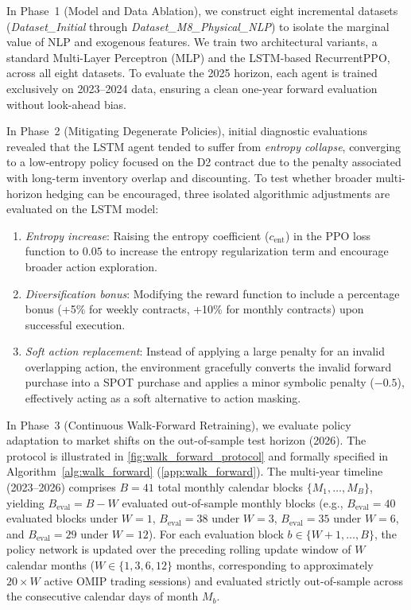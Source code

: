 In Phase~1 (Model and Data Ablation), we construct eight incremental datasets (\textit{Dataset\_Initial} through \textit{Dataset\_M8\_\allowbreak Physical\_NLP}) to isolate the marginal value of NLP and exogenous features. We train two architectural variants, a standard Multi-Layer Perceptron (MLP) and the LSTM-based RecurrentPPO, across all eight datasets. To evaluate the 2025 horizon, each agent is trained exclusively on 2023--2024 data, ensuring a clean one-year forward evaluation without look-ahead bias.

In Phase~2 (Mitigating Degenerate Policies), initial diagnostic evaluations revealed that the LSTM agent tended to suffer from \textit{entropy collapse}, converging to a low-entropy policy focused on the D2 contract due to the penalty associated with long-term inventory overlap and discounting. To test whether broader multi-horizon hedging can be encouraged, three isolated algorithmic adjustments are evaluated on the LSTM model:
\begin{enumerate}
    \item \textit{Entropy increase}: Raising the entropy coefficient ($c_{\text{ent}}$) in the PPO loss function to $0.05$ to increase the entropy regularization term and encourage broader action exploration.
    \item \textit{Diversification bonus}: Modifying the reward function to include a percentage bonus (+5\% for weekly contracts, +10\% for monthly contracts) upon successful execution.
    \item \textit{Soft action replacement}: Instead of applying a large penalty for an invalid overlapping action, the environment gracefully converts the invalid forward purchase into a SPOT purchase and applies a minor symbolic penalty ($-0.5$\texteuro), effectively acting as a soft alternative to action masking.
\end{enumerate}

In Phase~3 (Continuous Walk-Forward Retraining), we evaluate policy adaptation to market shifts on the out-of-sample test horizon (2026). The protocol is illustrated in \cref{fig:walk_forward_protocol} and formally specified in Algorithm~\ref{alg:walk_forward} (\ref{app:walk_forward}). The multi-year timeline (2023--2026) comprises $B = 41$ total monthly calendar blocks $\{M_1, \dots, M_B\}$, yielding $B_{\text{eval}} = B - W$ evaluated out-of-sample monthly blocks (e.g., $B_{\text{eval}} = 40$ evaluated blocks under $W=1$, $B_{\text{eval}} = 38$ under $W=3$, $B_{\text{eval}} = 35$ under $W=6$, and $B_{\text{eval}} = 29$ under $W=12$). For each evaluation block $b \in \{W+1, \dots, B\}$, the policy network is updated over the preceding rolling update window of $W$ calendar months ($W \in \{1, 3, 6, 12\}$ months, corresponding to approximately $20 \times W$ active OMIP trading sessions) and evaluated strictly out-of-sample across the consecutive calendar days of month $M_b$.

